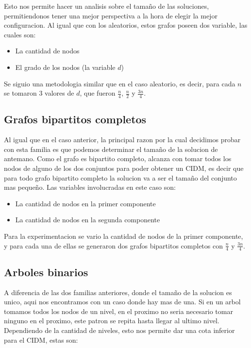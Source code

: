Esto nos permite hacer un analisis sobre el tamaño de las soluciones, permitiendonos tener una mejor perspectiva a la hora de elegir la mejor configuracion. Al igual que con los aleatorios, estos grafos poseen dos variable, las cuales son:

\begin{itemize}
	\item La cantidad de nodos
	\item El grado de los nodos (la variable $d$)
\end{itemize}
	
Se siguio una metodologia similar que en el caso aleatorio, es decir, para cada $n$ se tomaron 3 valores de $d$, que fueron $\frac{n}{4}$, $\frac{n}{2}$ y $\frac{3n}{4}$.

\subsection{Grafos bipartitos completos}

Al igual que en el caso anterior, la principal razon por la cual decidimos probar con esta familia es que podemos determinar el tamaño de la solucion de antemano. Como el grafo es bipartito completo, alcanza con tomar todos los nodos de alguno de los dos conjuntos para poder obtener un CIDM, es decir que para todo grafo bipartito completo la solucion va a ser el tamaño del conjunto mas pequeño. Las variables involucradas en este caso son:

\begin{itemize}
	\item La cantidad de nodos en la primer componente
	\item La cantidad de nodos en la segunda componente
\end{itemize}

Para la experimentacion se vario la cantidad de nodos de la primer componente, y para cada una de ellas se generaron dos grafos bipartitos completos con $\frac{n}{4}$ y $\frac{3n}{4}$.

\subsection{Arboles binarios}

A diferencia de las dos familias anteriores, donde el tamaño de la solucion es unico, aqui nos encontramos con un caso donde hay mas de una. Si en un arbol tomamos todos los nodos de un nivel, en el proximo no seria necesario tomar ninguno en el proximo, este patron se repita hasta llegar al ultimo nivel. Dependiendo de la cantidad de niveles, esto nos permite dar una cota inferior para el CIDM, estas son:

